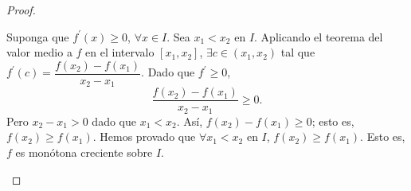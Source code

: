 \begin{frame}
\begin{proof}
\begin{enumerate}[(a)]
            Suponga que $f^{\prime}\left(x\right)\geq0$,
            $\forall x\in I$.
            Sea $x_{1}<x_{2}$ en $I$.
            Aplicando el \alert{teorema del valor medio} a $f$ en el
            intervalo $\left[x_{1},x_{2}\right]$,
            $\exists c\in\left(x_{1},x_{2}\right)$ tal que
            \begin{math}
              f^{\prime}\left(c\right)=
              \dfrac{
              f\left(x_{2}\right)-f\left(x_{1}\right)
              }{
              x_{2}-x_{1}
              }
            \end{math}.
            Dado que $f^{\prime}\geq0$,
            \begin{equation*}
              \frac{
              f\left(x_{2}\right)-
              f\left(x_{1}\right)
              }{x_{2}-x_{1}}\geq
              0.
            \end{equation*}
            Pero $x_{2}-x_{1}>0$ dado que $x_{1}<x_{2}$.
            Así, $f\left(x_{2}\right)-f\left(x_{1}\right)\geq0$;
            esto es,
            \begin{math}
              f\left(x_{2}\right)\geq
              f\left(x_{1}\right).
            \end{math}
            Hemos provado que $\forall x_{1}<x_{2}$ en $I$,
            $f\left(x_{2}\right)\geq f\left(x_{1}\right)$.
            Esto es, $f$ es monótona creciente sobre $I$.
    \end{enumerate}
  \end{proof}
\end{frame}